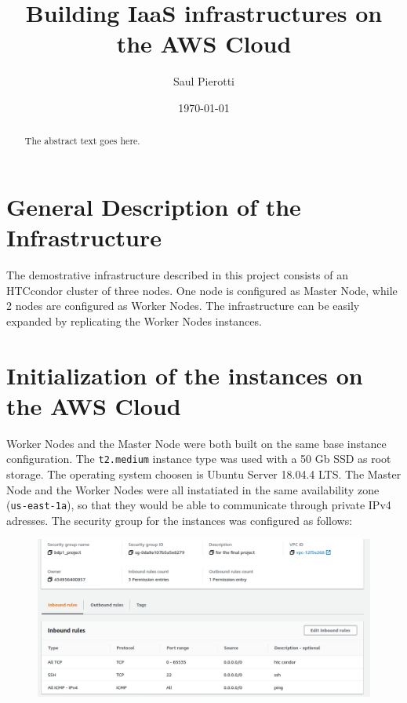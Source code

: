 \documentclass{article}
\begin{document}
\title{Building IaaS infrastructures on the AWS Cloud}
\author{Saul Pierotti}
\date{\today}

\maketitle

\begin{abstract}
The abstract text goes here.
\end{abstract}

\section{General Description of the Infrastructure}
The demostrative infrastructure described in this project consists of an HTCcondor cluster of three nodes.
One node is configured as Master Node, while 2 nodes are configured as Worker Nodes.
The infrastructure can be easily expanded by replicating the Worker Nodes instances.

\section{Initialization of the instances on the AWS Cloud}
Worker Nodes and the Master Node were both built on the same base instance configuration.
The \texttt{t2.medium} instance type was used with a 50 Gb SSD as root storage.
The operating system choosen is Ubuntu Server 18.04.4 LTS.
The Master Node and the Worker Nodes were all instatiated in the same availability zone (\texttt{us-east-1a}), so that they would be able to communicate through private IPv4 adresses.
The security group for the instances was configured as follows:

\begin{figure}[!h]
	\center
	\includegraphics[width=\textwidth]{./images/security-group.png}
\end{figure}
\end{document}
